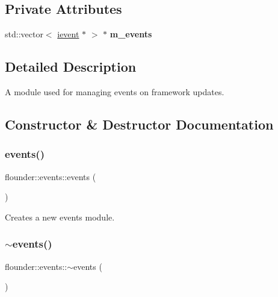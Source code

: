 \subsection*{Private Attributes}
\begin{DoxyCompactItemize}
\item 
\mbox{\label{classflounder_1_1events_ad6bb57d0e1858c5426cf9f466abc7253}} 
std\+::vector$<$ \hyperlink{classflounder_1_1ievent}{ievent} $\ast$ $>$ $\ast$ {\bfseries m\+\_\+events}
\end{DoxyCompactItemize}


\subsection{Detailed Description}
A module used for managing events on framework updates. 



\subsection{Constructor \& Destructor Documentation}
\mbox{\label{classflounder_1_1events_ae354f15876d95e28706b1d96dcd790af}} 
\subsubsection{\texorpdfstring{events()}{events()}}
{\footnotesize\ttfamily flounder\+::events\+::events (\begin{DoxyParamCaption}{ }\end{DoxyParamCaption})}



Creates a new events module. 

\mbox{\label{classflounder_1_1events_aaf446dc74703b8ce1c04f5cf8cb06eed}} 
\subsubsection{\texorpdfstring{$\sim$events()}{~events()}}
{\footnotesize\ttfamily flounder\+::events\+::$\sim$events (\begin{DoxyParamCaption}{ }\end{DoxyParamCaption})}



